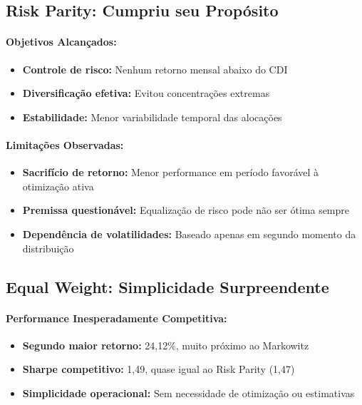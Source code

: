 \subsection{Risk Parity: Cumpriu seu Propósito}

\paragraph{Objetivos Alcançados:}
\begin{itemize}
    \item \textbf{Controle de risco:} Nenhum retorno mensal abaixo do CDI
    \item \textbf{Diversificação efetiva:} Evitou concentrações extremas
    \item \textbf{Estabilidade:} Menor variabilidade temporal das alocações
\end{itemize}

\paragraph{Limitações Observadas:}
\begin{itemize}
    \item \textbf{Sacrifício de retorno:} Menor performance em período favorável à otimização ativa
    \item \textbf{Premissa questionável:} Equalização de risco pode não ser ótima sempre
    \item \textbf{Dependência de volatilidades:} Baseado apenas em segundo momento da distribuição
\end{itemize}

\subsection{Equal Weight: Simplicidade Surpreendente}

\paragraph{Performance Inesperadamente Competitiva:}
\begin{itemize}
    \item \textbf{Segundo maior retorno:} 24,12\%, muito próximo ao Markowitz
    \item \textbf{Sharpe competitivo:} 1,49, quase igual ao Risk Parity (1,47)
    \item \textbf{Simplicidade operacional:} Sem necessidade de otimização ou estimativas
\end{itemize}

